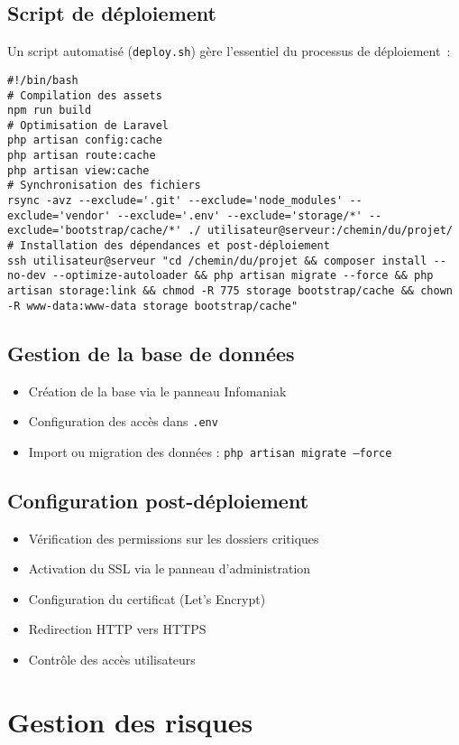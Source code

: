 \documentclass[a4paper,12pt]{report}
\begin{document}
\subsection{Script de déploiement}
Un script automatisé (\texttt{deploy.sh}) gère l’essentiel du processus de déploiement :
\begin{verbatim}
#!/bin/bash
# Compilation des assets
npm run build
# Optimisation de Laravel
php artisan config:cache
php artisan route:cache
php artisan view:cache
# Synchronisation des fichiers
rsync -avz --exclude='.git' --exclude='node_modules' --exclude='vendor' --exclude='.env' --exclude='storage/*' --exclude='bootstrap/cache/*' ./ utilisateur@serveur:/chemin/du/projet/
# Installation des dépendances et post-déploiement
ssh utilisateur@serveur "cd /chemin/du/projet && composer install --no-dev --optimize-autoloader && php artisan migrate --force && php artisan storage:link && chmod -R 775 storage bootstrap/cache && chown -R www-data:www-data storage bootstrap/cache"
\end{verbatim}

\subsection{Gestion de la base de données}
\begin{itemize}
  \item Création de la base via le panneau Infomaniak
  \item Configuration des accès dans \texttt{.env}
  \item Import ou migration des données : \texttt{php artisan migrate --force}
\end{itemize}

\subsection{Configuration post-déploiement}
\begin{itemize}
  \item Vérification des permissions sur les dossiers critiques
  \item Activation du SSL via le panneau d’administration
  \item Configuration du certificat (Let’s Encrypt)
  \item Redirection HTTP vers HTTPS
  \item Contrôle des accès utilisateurs
\end{itemize}

\section{Gestion des risques}
\end{document}
